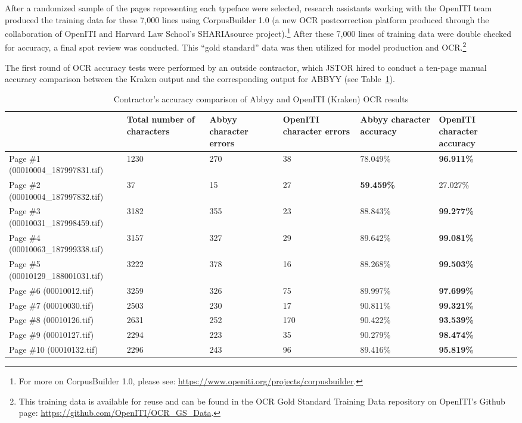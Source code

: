 After a randomized sample of the pages representing each typeface were
selected, research assistants working with the OpenITI team produced the
training data for these 7,000 lines using CorpusBuilder 1.0 (a new OCR
postcorrection platform produced through the collaboration of OpenITI and
Harvard Law School’s SHARIAsource project).\footnote{For more on CorpusBuilder
1.0, please see: \url{https://www.openiti.org/projects/corpusbuilder}.} After
these 7,000 lines of training data were double checked for accuracy, a final
spot review was conducted. This “gold standard” data was then utilized for
model production and OCR.\footnote{This training data is available for reuse
and can be found in the OCR Gold Standard Training Data repository on OpenITI’s
Github page: \url{https://github.com/OpenITI/OCR_GS_Data}.}

The first round of OCR accuracy tests were performed by an outside contractor,
which JSTOR hired to conduct a ten-page manual accuracy comparison between the
Kraken output and the corresponding output for ABBYY (see Table~\ref{tab_champs:table_1}).

\begin{table}[h!]
\begin{center}
\caption{Contractor's accuracy comparison of Abbyy and OpenITI (Kraken) OCR results}
\label{tab_champs:table_1}
	\begin{tabularx}{\textwidth}{p{2.7cm}XXXXX} \toprule
& \textbf{Total number of characters} & \textbf{Abbyy character errors} & \textbf{OpenITI character errors} & \textbf{Abbyy character accuracy} & \textbf{OpenITI character accuracy}\\\midrule
Page \#1 \scriptsize{(00010004\_187997831.tif)} & 1230 & 270 & 38 & 78.049\% & \textbf{96.911\%} \\
Page \#2 \scriptsize{(00010004\_187997832.tif)} & 37& 15 & 27 & \textbf{59.459\%} & 27.027\%\\
Page \#3 \scriptsize{(00010031\_187998459.tif)} & 3182 & 355 & 23 & 88.843\% & \textbf{99.277\%}\\
Page \#4 \scriptsize{(00010063\_187999338.tif)} & 3157 & 327 & 29 & 89.642\% & \textbf{99.081\%}\\
Page \#5 \scriptsize{(00010129\_188001031.tif)} & 3222 & 378 & 16 & 88.268\% & \textbf{99.503\%}\\
Page \#6 \scriptsize{(00010012.tif)} & 3259 & 326 & 75 & 89.997\% & \textbf{97.699\%}\\
Page \#7 \scriptsize{(00010030.tif)} & 2503 & 230 & 17 & 90.811\% & \textbf{99.321\%}\\
Page \#8 \scriptsize{(00010126.tif)} & 2631 & 252 & 170 & 90.422\% & \textbf{93.539\%}\\
Page \#9 \scriptsize{(00010127.tif)} & 2294 & 223 & 35 & 90.279\% & \textbf{98.474\%}\\
Page \#10 \scriptsize{(00010132.tif)} & 2296 & 243 & 96 & 89.416\% & \textbf{95.819\%}\\
\bottomrule
\end{tabularx}
\end{center}
\end{table}

